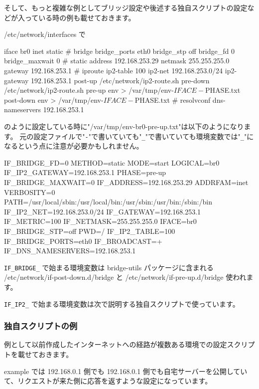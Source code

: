 \documentclass[mingoth,a4paper,twoside]{jsarticle}
\begin{document}
そして、もっと複雑な例としてブリッジ設定や後述する独自スクリプトの設定などが入っている時の例も載せておきます。

/etc/network/interfaces で

\begin{commandline}
iface br0 inet static
        # bridge
        bridge_ports eth0
        bridge_stp off
        bridge_fd 0
        bridge_maxwait 0
        # static
        address 192.168.253.29
        netmask 255.255.255.0
        gateway 192.168.253.1
        # iproute
        ip2-table 100
        ip2-net 192.168.253.0/24
        ip2-gateway 192.168.253.1
        post-up /etc/network/ip2-route.sh
        pre-down /etc/network/ip2-route.sh
        pre-up env > /var/tmp/env-$IFACE-$PHASE.txt
        post-down env > /var/tmp/env-$IFACE-$PHASE.txt
        # resolvconf
        dns-nameservers 192.168.253.1
\end{commandline}

のように設定している時に"/var/tmp/env-br0-pre-up.txt"は以下のようになります。
元の設定ファイルで"\verb+-+"で書いていても"\verb+_+"で書いていても環境変数では"\verb+_+"になるという点に注意が必要かもしれません。

\begin{commandline}
IF_BRIDGE_FD=0
METHOD=static
MODE=start
LOGICAL=br0
IF_IP2_GATEWAY=192.168.253.1
PHASE=pre-up
IF_BRIDGE_MAXWAIT=0
IF_ADDRESS=192.168.253.29
ADDRFAM=inet
VERBOSITY=0
PATH=/usr/local/sbin:/usr/local/bin:/usr/sbin:/usr/bin:/sbin:/bin
IF_IP2_NET=192.168.253.0/24
IF_GATEWAY=192.168.253.1
IF_METRIC=100
IF_NETMASK=255.255.255.0
IFACE=br0
IF_BRIDGE_STP=off
PWD=/
IF_IP2_TABLE=100
IF_BRIDGE_PORTS=eth0
IF_BROADCAST=+
IF_DNS_NAMESERVERS=192.168.253.1
\end{commandline}

\verb+IF_BRIDGE_+ で始まる環境変数は bridge-utils パッケージに含まれる
/etc/network/if-post-down.d/bridge
と
/etc/network/if-pre-up.d/bridge
使われます。

\verb+IF_IP2_+ で始まる環境変数は次で説明する独自スクリプトで使っています。

\subsubsection{独自スクリプトの例}

例として以前作成したインターネットへの経路が複数ある環境での設定スクリプトを載せておきます。

example では 192.168.0.1 側でも 192.168.0.1 側でも自宅サーバーを公開していて、リクエストが来た側に応答を返すような設定になっています。
\end{document}
